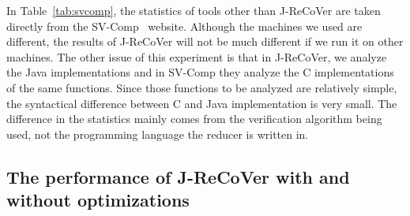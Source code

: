 \documentclass{llncs}
\begin{document}
In Table~\ref{tab:svcomp}, the statistics of tools other than J-ReCoVer are taken directly from the SV-Comp~\cite{svcomp} website. Although the machines we used are different, the results of J-ReCoVer will not be much different if we run it on other machines. The other issue of this experiment is that in J-ReCoVer, we analyze the Java implementations and in SV-Comp they analyze the C implementations of the same functions. Since those functions to be analyzed are relatively simple, the syntactical difference between C and Java implementation is very small. The difference in the statistics mainly comes from the verification algorithm being used, not the programming language the reducer is written in.
\begin{table}[t]
	\caption{SV-Comp 2018 results on reducer commutativity. For space reason, we only list the results of competitive tools in this table, which includes top three tools in the overall ranking and the reachability safety category.}\vspace{-1cm}
	\label{tab:svcomp}
\end{table}





\subsection{The performance of J-ReCoVer with and without optimizations}
\end{document}
